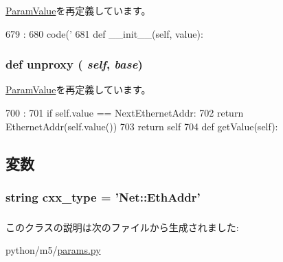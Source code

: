 \hyperlink{classm5_1_1params_1_1ParamValue_ab3dbcf5716623eac67a8ccc074fa7e13}{ParamValue}を再定義しています。


\begin{DoxyCode}
679                                 :
680         code('%
681 
    def __init__(self, value):
\end{DoxyCode}
\hypertarget{classm5_1_1params_1_1EthernetAddr_a587cd3c1e899640dc09d63793aa8093b}{
\subsubsection[{unproxy}]{\setlength{\rightskip}{0pt plus 5cm}def unproxy ( {\em self}, \/   {\em base})}}
\label{classm5_1_1params_1_1EthernetAddr_a587cd3c1e899640dc09d63793aa8093b}


\hyperlink{classm5_1_1params_1_1ParamValue_a587cd3c1e899640dc09d63793aa8093b}{ParamValue}を再定義しています。


\begin{DoxyCode}
700                            :
701         if self.value == NextEthernetAddr:
702             return EthernetAddr(self.value())
703         return self
704 
    def getValue(self):
\end{DoxyCode}


\subsection{変数}
\hypertarget{classm5_1_1params_1_1EthernetAddr_a2f1553ebb79374a68b36fdd6d8d82fc3}{
\subsubsection[{cxx\_\-type}]{\setlength{\rightskip}{0pt plus 5cm}string {\bf cxx\_\-type} = '{\bf Net::EthAddr}'}}
\label{classm5_1_1params_1_1EthernetAddr_a2f1553ebb79374a68b36fdd6d8d82fc3}
\hypertarget{classm5_1_1params_1_1EthernetAddr_afcc7a4b78ecd8fa7e713f8cfa0f51017}{
\subsubsection[{value}]{}}
\label{classm5_1_1params_1_1EthernetAddr_afcc7a4b78ecd8fa7e713f8cfa0f51017}


このクラスの説明は次のファイルから生成されました:\begin{DoxyCompactItemize}
\item 
python/m5/\hyperlink{params_8py}{params.py}\end{DoxyCompactItemize}
